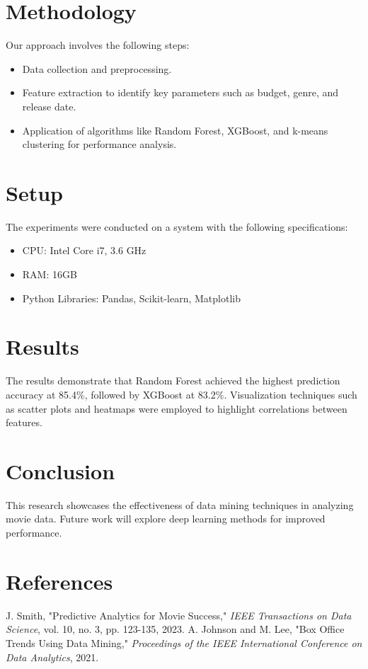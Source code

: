\documentclass[conference]{IEEEtran}
\begin{document}
\section{Methodology}
Our approach involves the following steps:
\begin{itemize}
    \item Data collection and preprocessing.
    \item Feature extraction to identify key parameters such as budget, genre, and release date.
    \item Application of algorithms like Random Forest, XGBoost, and k-means clustering for performance analysis.
\end{itemize}

\section{Setup}
The experiments were conducted on a system with the following specifications:
\begin{itemize}
    \item CPU: Intel Core i7, 3.6 GHz
    \item RAM: 16GB
    \item Python Libraries: Pandas, Scikit-learn, Matplotlib
\end{itemize}

\section{Results}
The results demonstrate that Random Forest achieved the highest prediction accuracy at 85.4\%, followed by XGBoost at 83.2\%. Visualization techniques such as scatter plots and heatmaps were employed to highlight correlations between features.

\section{Conclusion}
This research showcases the effectiveness of data mining techniques in analyzing movie data. Future work will explore deep learning methods for improved performance.

\section*{References}
\begin{thebibliography}{00}
 J. Smith, "Predictive Analytics for Movie Success," \textit{IEEE Transactions on Data Science}, vol. 10, no. 3, pp. 123-135, 2023.
 A. Johnson and M. Lee, "Box Office Trends Using Data Mining," \textit{Proceedings of the IEEE International Conference on Data Analytics}, 2021.
\end{thebibliography}
\end{document}
